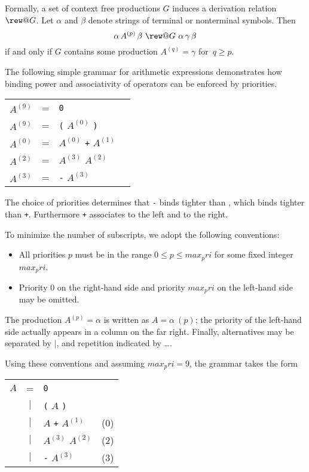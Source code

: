 Formally, a set of context free productions $G$ induces a derivation
relation $\rew@G$.  Let $\alpha$ and $\beta$ denote strings of terminal or
nonterminal symbols.  Then
\[ \alpha\, A^{(p)}\, \beta ~\rew@G~ \alpha\,\gamma\,\beta \] 
if and only if $G$ contains some production $A^{(q)}=\gamma$ for~$q\ge p$.

The following simple grammar for arithmetic expressions demonstrates how
binding power and associativity of operators can be enforced by priorities.
\begin{center}
\begin{tabular}{rclr}
  $A^{(9)}$ & = & {\tt0} \\
  $A^{(9)}$ & = & {\tt(} $A^{(0)}$ {\tt)} \\
  $A^{(0)}$ & = & $A^{(0)}$ {\tt+} $A^{(1)}$ \\
  $A^{(2)}$ & = & $A^{(3)}$ {\tt*} $A^{(2)}$ \\
  $A^{(3)}$ & = & {\tt-} $A^{(3)}$
\end{tabular}
\end{center}
The choice of priorities determines that {\tt -} binds tighter than {\tt *},
which binds tighter than {\tt +}.  Furthermore {\tt +} associates to the
left and {\tt *} to the right.

To minimize the number of subscripts, we adopt the following conventions:
\begin{itemize}
\item All priorities $p$ must be in the range $0 \leq p \leq max_pri$ for
  some fixed integer $max_pri$.
\item Priority $0$ on the right-hand side and priority $max_pri$ on the
  left-hand side may be omitted.
\end{itemize}
The production $A^{(p)} = \alpha$ is written as $A = \alpha~(p)$;
the priority of the left-hand side actually appears in a column on the far
right.  Finally, alternatives may be separated by $|$, and repetition
indicated by \dots.

Using these conventions and assuming $max_pri=9$, the grammar takes the form
\begin{center}
\begin{tabular}{rclc}
$A$ & = & {\tt0} & \hspace*{4em} \\
 & $|$ & {\tt(} $A$ {\tt)} \\
 & $|$ & $A$ {\tt+} $A^{(1)}$ & (0) \\
 & $|$ & $A^{(3)}$ {\tt*} $A^{(2)}$ & (2) \\
 & $|$ & {\tt-} $A^{(3)}$ & (3)
\end{tabular}
\end{center}


